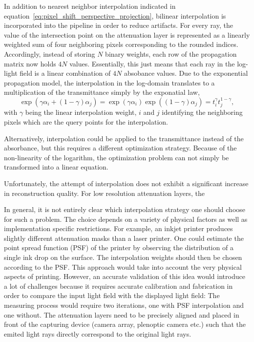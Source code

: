 In addition to nearest neighbor interpolation indicated in equation~\ref{eq:pixel_shift_perspective_projection}, bilinear interpolation is incorporated into the pipeline in order to reduce artifacts.
For every ray, the value of the intersection point on the attenuation layer is represented as a linearly weighted sum of four neighboring pixels corresponding to the rounded indices.
Accordingly, instead of storing $N$ binary weights, each row of the propagation matrix now holds $4 N$ values.
Essentially, this just means that each ray in the log-light field is a linear combination of $4 N$ absobance values.
Due to the exponential propagation model, the interpolation in the log-domain translates to a multiplication of the transmittance simply by the exponatial law,
\begin{equation*}	
	\exp( \gamma \alpha_i + (1 - \gamma) \alpha_j ) = \exp( \gamma \alpha_i ) \exp( (1 - \gamma) \alpha_j ) = t_i^{\gamma} t_j^{1 - \gamma},
\end{equation*}
with $\gamma$ being the linear interpolation weight, $i$ and $j$ identifying the neighboring pixels which are the query points for the interpolation.

Alternatively, interpolation could be applied to the transmittance instead of the absorbance, but this requires a different optimization strategy.
Because of the non-linearity of the logarithm, the optimization problem can not simply be transformed into a linear equation.

Unfortunately, the attempt of interpolation does not exhibit a significant increase in reconstruction quality.
For low resolution attenuation layers, the 

In general, it is not entirely clear which interpolation strategy one should choose for such a problem.
The choice depends on a variety of physical factors as well as implementation specific restrictions.
For example, an inkjet printer produces slightly different attenuation masks than a laser printer.
One could estimate the point spread function (PSF) of the printer by observing the distribution of a single ink drop on the surface.
The interpolation weights should then be chosen according to the PSF.
This approach would take into account the very physical aspects of printing.
However, an accurate validation of this idea would introduce a lot of challenges because it requires accurate calibration and fabrication in order to compare the input light field with the displayed light field:
The measuring process would require two iterations, one with PSF interpolation and one without.
The attenuation layers need to be precisely aligned and placed in front of the capturing device (camera array, plenoptic camera etc.) such that the emited light rays directly correspond to the original light rays.

